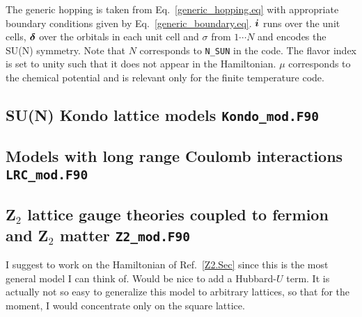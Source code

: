 The  generic hopping is taken from Eq.~\ref{generic_hopping.eq}   with appropriate boundary conditions given by Eq.~\ref{generic_boundary.eq}.    $\boldsymbol{i}$ runs over the unit cells, $\boldsymbol{\delta}$ over the orbitals in each unit cell and $\sigma$  from $1 \cdots N$  and encodes  the SU(N) symmetry.    Note that  $N$ corresponds to \texttt{N\_SUN}  in the code.  The flavor index is set to  unity such that it does not appear in the  Hamiltonian.  $\mu$ corresponds to the chemical potential  and is relevant only for the finite temperature code. 

\subsection{  SU(N) Kondo lattice models  \texttt{Kondo\_mod.F90}}





\subsection{  Models with long range Coulomb interactions  \texttt{LRC\_mod.F90}}



\subsection{Z$_2$ lattice gauge theories coupled to fermion and  Z$_2$ matter    \texttt{Z2\_mod.F90}}
I suggest to work on the  Hamiltonian of Ref.~\ref{Z2.Sec} since this is the most general  model I can think of.   Would be nice to add a Hubbard-$U$ term.  It is actually not so easy to generalize this model to 
arbitrary lattices, so that for the moment, I would concentrate only on the square lattice. 
